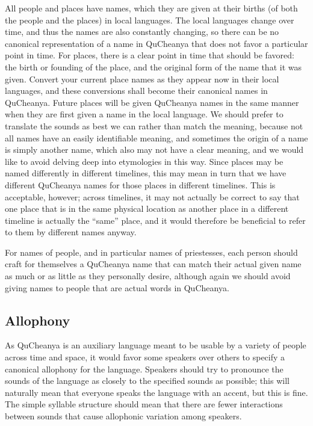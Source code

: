 \documentclass{article}
\begin{document}
All people and places have names, which they are given at their births (of both the people and the places) in local languages. The local languages change over time, and thus the names are also constantly changing, so there can be no canonical representation of a name in QuCheanya that does not favor a particular point in time. For places, there is a clear point in time that should be favored: the birth or founding of the place, and the original form of the name that it was given. Convert your current place names as they appear now in their local languages, and these conversions shall become their canonical names in QuCheanya. Future places will be given QuCheanya names in the same manner when they are first given a name in the local language. We should prefer to translate the sounds as best we can rather than match the meaning, because not all names have an easily identifiable meaning, and sometimes the origin of a name is simply another name, which also may not have a clear meaning, and we would like to avoid delving deep into etymologies in this way. Since places may be named differently in different timelines, this may mean in turn that we have different QuCheanya names for those places in different timelines. This is acceptable, however; across timelines, it may not actually be correct to say that one place that is in the same physical location as another place in a different timeline is actually the ``same'' place, and it would therefore be beneficial to refer to them by different names anyway.

For names of people, and in particular names of priestesses, each person should craft for themselves a QuCheanya name that can match their actual given name as much or as little as they personally desire, although again we should avoid giving names to people that are actual words in QuCheanya.

\subsection{Allophony}
As QuCheanya is an auxiliary language meant to be usable by a variety of people across time and space, it would favor some speakers over others to specify a canonical allophony for the language. Speakers should try to pronounce the sounds of the language as closely to the specified sounds as possible; this will naturally mean that everyone speaks the language with an accent, but this is fine. The simple syllable structure should mean that there are fewer interactions between sounds that cause allophonic variation among speakers.
\end{document}
